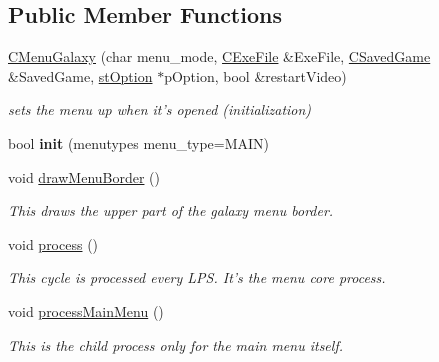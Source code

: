 \subsection*{Public Member Functions}
\begin{DoxyCompactItemize}
\item 
\hypertarget{classgalaxy_1_1_c_menu_galaxy_a8566b7034caea2dbd9576b04fa86e3bd}{
\hyperlink{classgalaxy_1_1_c_menu_galaxy_a8566b7034caea2dbd9576b04fa86e3bd}{CMenuGalaxy} (char menu\_\-mode, \hyperlink{class_c_exe_file}{CExeFile} \&ExeFile, \hyperlink{class_c_saved_game}{CSavedGame} \&SavedGame, \hyperlink{structst_option}{stOption} $\ast$pOption, bool \&restartVideo)}
\label{classgalaxy_1_1_c_menu_galaxy_a8566b7034caea2dbd9576b04fa86e3bd}

\begin{DoxyCompactList}\small\item\em sets the menu up when it's opened (initialization) \item\end{DoxyCompactList}\item 
\hypertarget{classgalaxy_1_1_c_menu_galaxy_a494139ffeac4ed53cd4e84a8a3b03f92}{
bool {\bfseries init} (menutypes menu\_\-type=MAIN)}
\label{classgalaxy_1_1_c_menu_galaxy_a494139ffeac4ed53cd4e84a8a3b03f92}

\item 
\hypertarget{classgalaxy_1_1_c_menu_galaxy_a94c20151a9e1b1e0e809190dca8b7908}{
void \hyperlink{classgalaxy_1_1_c_menu_galaxy_a94c20151a9e1b1e0e809190dca8b7908}{drawMenuBorder} ()}
\label{classgalaxy_1_1_c_menu_galaxy_a94c20151a9e1b1e0e809190dca8b7908}

\begin{DoxyCompactList}\small\item\em This draws the upper part of the galaxy menu border. \item\end{DoxyCompactList}\item 
\hypertarget{classgalaxy_1_1_c_menu_galaxy_a71ea1a3f7151e49d503122336abfcd00}{
void \hyperlink{classgalaxy_1_1_c_menu_galaxy_a71ea1a3f7151e49d503122336abfcd00}{process} ()}
\label{classgalaxy_1_1_c_menu_galaxy_a71ea1a3f7151e49d503122336abfcd00}

\begin{DoxyCompactList}\small\item\em This cycle is processed every LPS. It's the menu core process. \item\end{DoxyCompactList}\item 
\hypertarget{classgalaxy_1_1_c_menu_galaxy_a5d2b237c2728d28737223cb5c1f06652}{
void \hyperlink{classgalaxy_1_1_c_menu_galaxy_a5d2b237c2728d28737223cb5c1f06652}{processMainMenu} ()}
\label{classgalaxy_1_1_c_menu_galaxy_a5d2b237c2728d28737223cb5c1f06652}

\begin{DoxyCompactList}\small\item\em This is the child process only for the main menu itself. \item\end{DoxyCompactList}\end{DoxyCompactItemize}
